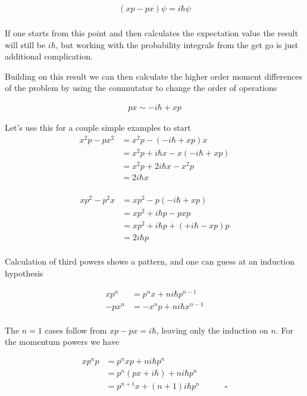 \documentclass{article}
\begin{document}
\begin{align*}
(x p - p x) \psi = i \hbar \psi \\
\end{align*}

If one starts from this point and then calculates the expectation value the result will still be $i \hbar$, but working
with the probability integrals from the get go is just additional complication.

Building on this result we can then calculate the higher order moment differences of the problem by using the commutator
to change the order of operations

\begin{align*}
p x \sim -i \hbar + x p
\end{align*}

Let's use this for a couple simple examples to start
\begin{align*}
x^2 p - p x^2
&=
x^2 p - ( -i \hbar + x p) x \\
&=
x^2 p + i \hbar x - x ( -i \hbar + x p) \\
&=
x^2 p + 2 i \hbar x - x^2 p \\
&=
2 i \hbar x \\
\end{align*}

\begin{align*}
x p^2 - p^2 x
&=
x p^2 - p ( -i \hbar + x p) \\
&=
x p^2 + i \hbar p - p x p \\
&=
x p^2 + i \hbar p + ( +i \hbar - x p) p \\
&=
2 i \hbar p \\
\end{align*}

Calculation of third powers shows a pattern, and one can guess at an induction hypothesis

\begin{align*}
x p^n &= p^n x + n i \hbar p^{n-1} \\
-p x^n &= -x^n p + n i \hbar x^{n-1} \\
\end{align*}

The $n=1$ cases follow from $xp - px = i\hbar$, leaving only the induction on $n$.  For the momentum powers we have

\begin{align*}
x p^n p 
&= p^n x p + n i \hbar p^{n} \\
&= p^n (p x + i \hbar) + n i \hbar p^{n} \\
&= p^{n+1} x + (n+1) i \hbar p^{n} \quad\quad\quad\square \\
\end{align*}
\end{document}
